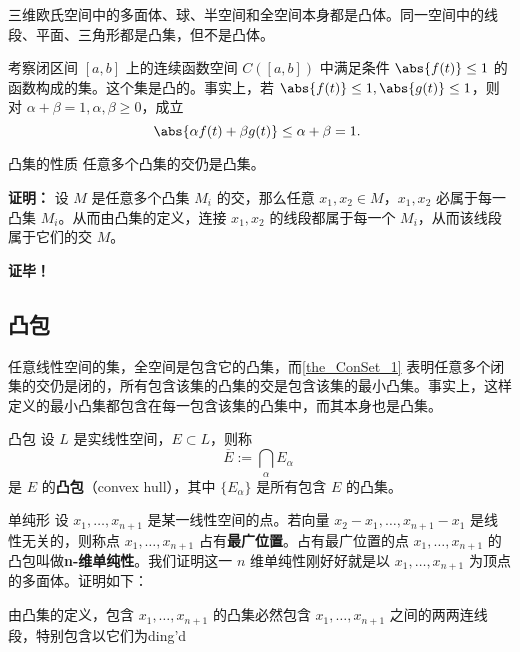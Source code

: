 \begin{example}{}
三维欧氏空间中的多面体、球、半空间和全空间本身都是凸体。同一空间中的线段、平面、三角形都是凸集，但不是凸体。
\end{example}

\begin{example}{}
考察闭区间 $[a,b]$ 上的连续函数空间 $C([a,b])$ 中满足条件 $\abs{f(t)}\leq1$ 的函数构成的集。这个集是凸的。事实上，若 $\abs{f(t)}\leq1,\abs{g(t)}\leq1$，则对 $\alpha+\beta=1,\alpha,\beta\geq0$，成立
\begin{equation}
\abs{\alpha f(t)+\beta g(t)}\leq\alpha+\beta=1.~
\end{equation}

\end{example}




\begin{theorem}{凸集的性质}\label{the_ConSet_1}
任意多个凸集的交仍是凸集。
\end{theorem}
\textbf{证明：} 设 $M$ 是任意多个凸集 $M_i$ 的交，那么任意 $x_1,x_2\in M$，$x_1,x_2$ 必属于每一凸集 $M_i$。从而由凸集的定义，连接 $x_1,x_2$ 的线段都属于每一个 $M_i$，从而该线段属于它们的交 $M$。

\textbf{证毕！} 

\subsection{凸包}
任意线性空间的集，全空间是包含它的凸集，而\autoref{the_ConSet_1} 表明任意多个闭集的交仍是闭的，所有包含该集的凸集的交是包含该集的最小凸集。事实上，这样定义的最小凸集都包含在每一包含该集的凸集中，而其本身也是凸集。
\begin{definition}{凸包}
设 $L$ 是实线性空间，$E\subset L$，则称
\begin{equation}
\overline{E}:=\bigcap_{\alpha}E_\alpha~
\end{equation}
是 $E$ 的\textbf{凸包}（convex hull），其中 $\{E_\alpha\}$ 是所有包含 $E$ 的凸集。
\end{definition}

\begin{example}{单纯形}
设 $x_1,\ldots,x_{n+1}$ 是某一线性空间的点。若向量 $x_2-x_1,\ldots,x_{n+1}-x_1$ 是线性无关的，则称点 $x_1,\ldots,x_{n+1}$ 占有\textbf{最广位置}。占有最广位置的点 $x_1,\ldots,x_{n+1}$ 的凸包叫做\textbf{n-维单纯性}。我们证明这一 $n$ 维单纯性刚好好就是以 $x_1,\ldots,x_{n+1}$ 为顶点的多面体。证明如下：

由凸集的定义，包含 $x_1,\ldots,x_{n+1}$ 的凸集必然包含 $x_1,\ldots,x_{n+1}$ 之间的两两连线段，特别包含以它们为ding'd

\end{example}





















